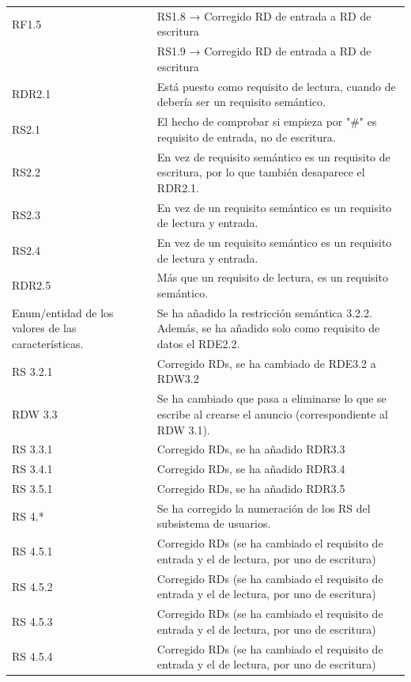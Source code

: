 \begin{longtable}{|p{3cm}|p{11cm}|}
RF1.5 & RS1.8 → Corregido RD de entrada a RD de escritura\\
      & RS1.9 → Corregido RD de entrada a RD de escritura\\
\hline



RDR2.1 & Está puesto como requisito de lectura, cuando de debería ser un requisito semántico.\\
\hline

RS2.1 & El hecho de comprobar si empieza por "\#" es requisito de entrada, no de escritura.\\
\hline

RS2.2 & En vez de requisito semántico es un requisito de escritura, por lo que también desaparece el RDR2.1.\\
\hline

RS2.3 & En vez de un requisito semántico es un requisito de lectura y entrada.\\
\hline

RS2.4 & En vez de un requisito semántico es un requisito de lectura y entrada.\\
\hline

RDR2.5 & Más que un requisito de lectura, es un requisito semántico.\\
\hline

Enum/entidad de los valores de las características. & Se ha añadido la restricción semántica 3.2.2. Además, se ha añadido solo como requisito de datos el RDE2.2. \\
\hline

RS 3.2.1 & Corregido RDs, se ha cambiado de RDE3.2 a RDW3.2 \\
\hline

RDW 3.3 & Se ha cambiado que pasa a eliminarse lo que se escribe al crearse el anuncio (correspondiente al RDW 3.1). \\
\hline

RS 3.3.1 & Corregido RDs, se ha añadido RDR3.3\\
\hline

RS 3.4.1 & Corregido RDs, se ha añadido RDR3.4 \\
\hline

RS 3.5.1 & Corregido RDs, se ha añadido RDR3.5 \\
\hline

RS 4.* & Se ha corregido la numeración de los RS del subsistema de usuarios. \\
\hline
RS 4.5.1 & Corregido RDs (se ha cambiado el requisito de entrada y el de lectura, por uno de escritura) \\
\hline
RS 4.5.2 & Corregido RDs (se ha cambiado el requisito de entrada y el de lectura, por uno de escritura)\\
\hline
RS 4.5.3 & Corregido RDs (se ha cambiado el requisito de entrada y el de lectura, por uno de escritura) \\
\hline
RS 4.5.4 & Corregido RDs (se ha cambiado el requisito de entrada y el de lectura, por uno de escritura)\\
\hline


\end{longtable}
